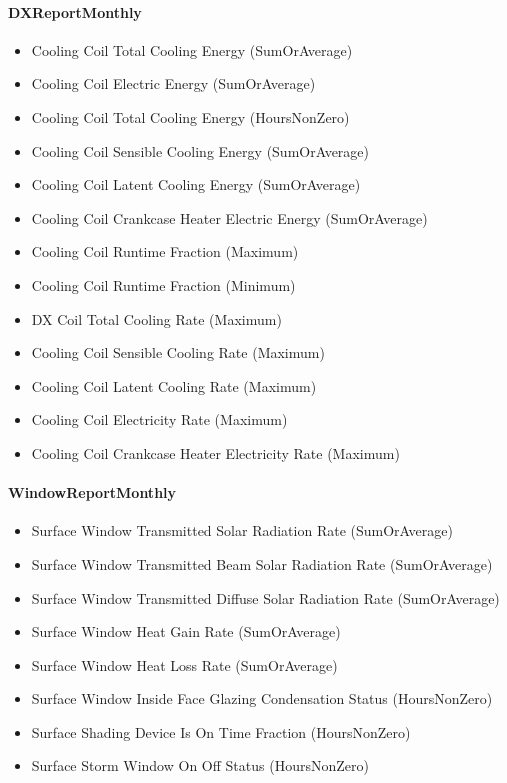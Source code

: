 \paragraph{DXReportMonthly}\label{dxreportmonthly}

\begin{itemize}
\item
  Cooling Coil Total Cooling Energy (SumOrAverage)
\item
  Cooling Coil Electric Energy (SumOrAverage)
\item
  Cooling Coil Total Cooling Energy (HoursNonZero)
\item
  Cooling Coil Sensible Cooling Energy (SumOrAverage)
\item
  Cooling Coil Latent Cooling Energy (SumOrAverage)
\item
  Cooling Coil Crankcase Heater Electric Energy (SumOrAverage)
\item
  Cooling Coil Runtime Fraction (Maximum)
\item
  Cooling Coil Runtime Fraction (Minimum)
\item
  DX Coil Total Cooling Rate (Maximum)
\item
  Cooling Coil Sensible Cooling Rate (Maximum)
\item
  Cooling Coil Latent Cooling Rate (Maximum)
\item
  Cooling Coil Electricity Rate (Maximum)
\item
  Cooling Coil Crankcase Heater Electricity Rate (Maximum)
\end{itemize}

\paragraph{WindowReportMonthly}\label{windowreportmonthly}

\begin{itemize}
\item
  Surface Window Transmitted Solar Radiation Rate (SumOrAverage)
\item
  Surface Window Transmitted Beam Solar Radiation Rate (SumOrAverage)
\item
  Surface Window Transmitted Diffuse Solar Radiation Rate (SumOrAverage)
\item
  Surface Window Heat Gain Rate (SumOrAverage)
\item
  Surface Window Heat Loss Rate (SumOrAverage)
\item
  Surface Window Inside Face Glazing Condensation Status (HoursNonZero)
\item
  Surface Shading Device Is On Time Fraction (HoursNonZero)
\item
  Surface Storm Window On Off Status (HoursNonZero)
\end{itemize}

